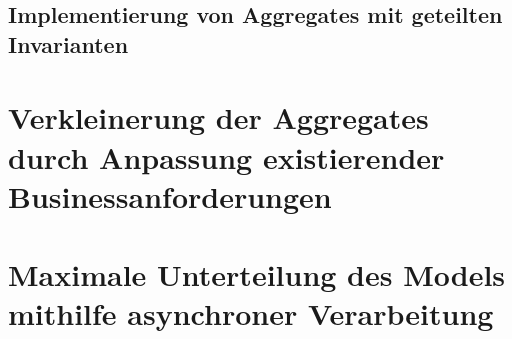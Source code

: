 \subsection{Implementierung von Aggregates mit geteilten Invarianten}



\section{Verkleinerung der Aggregates durch Anpassung existierender Businessanforderungen }
\blindtext

\section{Maximale Unterteilung des Models mithilfe asynchroner Verarbeitung }
\blindtext
